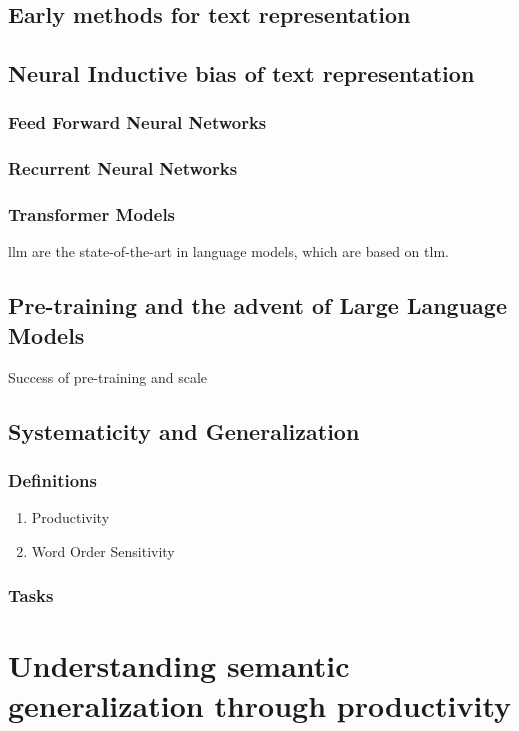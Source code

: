 \documentclass[letterpaper, 12pt]{report}
\begin{document}
\section{Early methods for text representation}
\label{sec:org36095ba}
\section{Neural Inductive bias of text representation}
\label{sec:org1962e2d}
\subsection{Feed Forward Neural Networks}
\label{sec:org0a7045d}
\subsection{Recurrent Neural Networks}
\label{sec:org768a21d}
\subsection{Transformer Models}
\label{sec:org16f1a22}

\gls{llm} are the state-of-the-art in language models, which are based on \gls{tlm}.
\section{Pre-training and the advent of Large Language Models}
\label{sec:org7274d30}
Success of pre-training and scale
\section{Systematicity and Generalization}
\label{sec:orgcf6e128}
\subsection{Definitions}
\label{sec:orga318eb1}
\begin{enumerate}
\item Productivity
\label{sec:orge58aa17}
\item Word Order Sensitivity
\label{sec:org8020cf9}
\end{enumerate}
\subsection{Tasks}
\label{sec:org6657ae7}
\clearpage
\chapter{Understanding semantic generalization through productivity}
\label{sec:orgcc5df70}
\end{document}
